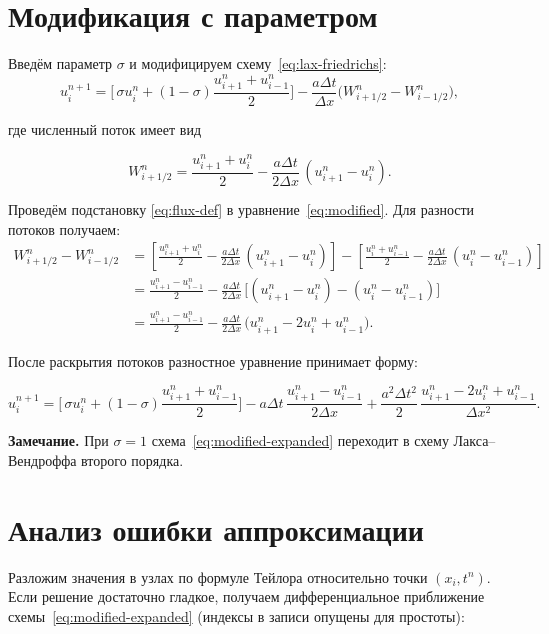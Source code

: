\documentclass[14pt]{report}
\begin{document}
\section{Модификация с параметром}
Введём параметр $\sigma$ и модифицируем схему~\eqref{eq:lax-friedrichs}:
\begin{equation*}
u_i^{n+1} = \biggl[\,\sigma u_i^n 
            + (1-\sigma)\frac{u_{i+1}^n + u_{i-1}^n}{2}\biggr]
            - \frac{a\Delta t}{\Delta x}\bigl(W^n_{i+1/2} - W^n_{i-1/2}\bigr),
\label{eq:modified}
\end{equation*}

где численный поток имеет вид

\begin{equation}
W^n_{i+1/2} = \frac{u_{i+1}^n + u_i^n}{2} 
              - \frac{a\Delta t}{2\Delta x}\,(u_{i+1}^n - u_i^n).
\label{eq:flux-def}
\end{equation}

Проведём подстановку \eqref{eq:flux-def} в уравнение~\eqref{eq:modified}. Для разности потоков получаем:
\begin{align*}
W^n_{i+1/2} - W^n_{i-1/2} 
&= \left[ \frac{u_{i+1}^n + u_i^n}{2} - \frac{a\Delta t}{2\Delta x}\,(u_{i+1}^n - u_i^n) \right] - \left[ \frac{u_i^n + u_{i-1}^n}{2} - \frac{a\Delta t}{2\Delta x}\,(u_i^n - u_{i-1}^n) \right] \\[4pt]
&= \frac{u_{i+1}^n - u_{i-1}^n}{2} 
   - \frac{a\Delta t}{2\Delta x}\,
     \bigl[ (u_{i+1}^n - u_i^n) - (u_i^n - u_{i-1}^n) \bigr] \\[4pt]
&= \frac{u_{i+1}^n - u_{i-1}^n}{2} 
   - \frac{a\Delta t}{2\Delta x}\,
     \bigl( u_{i+1}^n - 2u_i^n + u_{i-1}^n \bigr).
\end{align*}

После раскрытия потоков разностное уравнение принимает форму:

\begin{equation}
u_i^{n+1} = \biggl[\,\sigma u_i^n 
            + (1-\sigma)\frac{u_{i+1}^n + u_{i-1}^n}{2}\biggr]
            - a\Delta t\,\frac{u_{i+1}^n - u_{i-1}^n}{2\Delta x}
            + \frac{a^2\Delta t^2}{2}\,
              \frac{u_{i+1}^n - 2u_i^n + u_{i-1}^n}{\Delta x^2}.
\label{eq:modified-expanded}
\end{equation}

\textbf{Замечание.} При $\sigma=1$ схема~\eqref{eq:modified-expanded} переходит в схему Лакса--Вендроффа второго порядка.

\section{Анализ ошибки аппроксимации}
Разложим значения в узлах по формуле Тейлора относительно точки $(x_i,t^n)$. Если решение достаточно гладкое, получаем дифференциальное приближение схемы~\eqref{eq:modified-expanded} (индексы в записи опущены для простоты):
\end{document}
